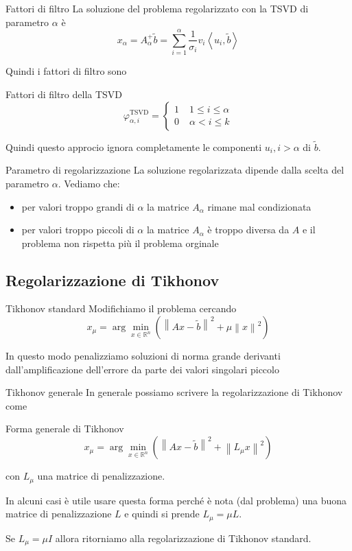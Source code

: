 \documentclass{beamer}
\theoremstyle{plain}
\theoremstyle{definition}
\theoremstyle{remark}
\newcommand{\pa}[1]{\left(#1\right)}
\newcommand{\ang}[1]{\left<#1\right>}
\newcommand{\norm}[1]{\left\|#1\right\|}
\begin{document}
\begin{frame}{Fattori di filtro}
  La soluzione del problema regolarizzato con la TSVD di parametro
  $\alpha$ è
  \[ x_\alpha = A_\alpha ^+ \tilde b = \sum _{i=1} ^\alpha
  \frac{1}{\sigma _i} v_i \ang{u_i,\tilde b} \]
  \vfill

  Quindi i fattori di filtro sono
  \begin{block}{Fattori di filtro della TSVD}
  \[ \varphi ^{\text{TSVD}}_{\alpha,i} = \left\{
    \begin{matrix}
      1 \; &1\le i \le \alpha\\
      0 \; &\alpha < i \le k
    \end{matrix}
    \right. \]
  \end{block}
  \vfill
  
  Quindi questo approcio ignora completamente le componenti $u_i,
  i>\alpha$ di $\tilde b$.
\end{frame}

\begin{frame}{Parametro di regolarizzazione}
  La soluzione regolarizzata dipende dalla scelta del parametro
  $\alpha$. Vediamo che:
  \begin{itemize}
  \item per valori troppo grandi di $\alpha$ la matrice $A_\alpha$
    rimane mal condizionata
  \item per valori troppo piccoli di $\alpha$ la matrice $A_\alpha$ è
    troppo diversa da $A$ e il problema non rispetta più il problema
    orginale
  \end{itemize}
\end{frame}


\subsection{Regolarizzazione di Tikhonov}

\begin{frame}{Tikhonov standard}
  Modifichiamo il problema cercando
  \[ x_\mu = \arg\min _{x \in \mathbb{R}^n} \pa{ \norm{Ax -\tilde b}^2
    + \mu\norm{x}^2} \]
  \vfill
  
  In questo modo penalizziamo soluzioni di norma grande derivanti
  dall'amplificazione dell'errore da parte dei valori singolari piccolo
\end{frame}

\begin{frame}{Tikhonov generale}
  In generale possiamo scrivere la regolarizzazione di Tikhonov come
  \begin{block}{Forma generale di Tikhonov}
  \[ x_\mu = \arg\min _{x \in \mathbb{R}^n} \pa{ \norm{Ax -\tilde b}^2 +
    \norm{L_\mu x}^2} \]
  \end{block}
  con $L_\mu$ una matrice di penalizzazione.

  In alcuni casi è utile usare questa forma perché è nota (dal
  problema) una buona matrice di penalizzazione $L$ e quindi si prende
  $L_\mu = \mu L$.
  \vfill

  Se $L_\mu = \mu I$ allora ritorniamo alla regolarizzazione di
  Tikhonov standard.
\end{frame}
\end{document}
